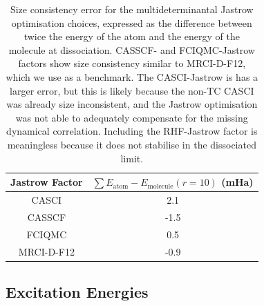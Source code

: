 \begin{table}[htbp]
    \centering
    \begin{tabular}{c|c}
        Jastrow Factor & $\sum E_\mathrm{atom} - E_\mathrm{molecule}(r=10)$ (mHa) \\
        \hline
        CASCI & 2.1 \\
        CASSCF & -1.5 \\
        FCIQMC & 0.5 \\
        \bottomrule
        MRCI-D-F12 & -0.9
    \end{tabular}
    \caption{Size consistency error for the multideterminantal Jastrow optimisation choices, expressed as the difference between twice the energy of the atom and the energy of the molecule at dissociation. CASSCF- and FCIQMC-Jastrow factors show size consistency similar to MRCI-D-F12, which we use as a benchmark. The CASCI-Jastrow is has a larger error, but this is likely because the non-TC CASCI was already size inconsistent, and the Jastrow optimisation was not able to adequately compensate for the missing dynamical correlation. Including the RHF-Jastrow factor is meaningless because it does not stabilise in the dissociated limit.
    }
    \label{tbl:size-consistency}
\end{table}


\subsection{Excitation Energies}

